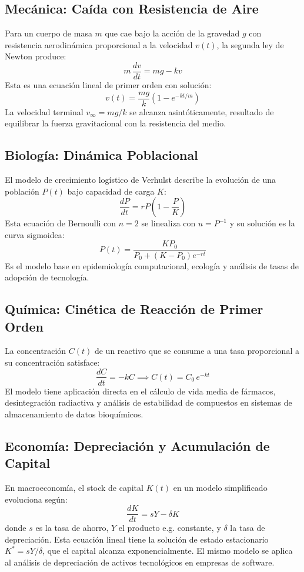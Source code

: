 \documentclass[12pt,letterpaper]{report}
\numberwithin{equation}{chapter}
\numberwithin{figure}{chapter}
\numberwithin{table}{chapter}
\begin{document}
\subsection{Mecánica: Caída con Resistencia de Aire}

Para un cuerpo de masa $m$ que cae bajo la acción de la gravedad $g$ con resistencia aerodinámica proporcional a la velocidad $v(t)$, la segunda ley de Newton produce:
\[
m\,\dfrac{dv}{dt} = mg - kv
\]
Esta es una ecuación lineal de primer orden con solución:
\[
v(t) = \dfrac{mg}{k}\!\left(1 - e^{-kt/m}\right)
\]
La velocidad terminal $v_{\infty} = mg/k$ se alcanza asintóticamente, resultado de equilibrar la fuerza gravitacional con la resistencia del medio.

\subsection{Biología: Dinámica Poblacional}

El modelo de crecimiento logístico de Verhulst describe la evolución de una población $P(t)$ bajo capacidad de carga $K$:
\[
\dfrac{dP}{dt} = rP\!\left(1 - \dfrac{P}{K}\right)
\]
Esta ecuación de Bernoulli con $n = 2$ se linealiza con $u = P^{-1}$ y su solución es la curva sigmoidea:
\[
P(t) = \dfrac{KP_0}{P_0 + (K - P_0)e^{-rt}}
\]
Es el modelo base en epidemiología computacional, ecología y análisis de tasas de adopción de tecnología.

\subsection{Química: Cinética de Reacción de Primer Orden}

La concentración $C(t)$ de un reactivo que se consume a una tasa proporcional a su concentración satisface:
\[
\dfrac{dC}{dt} = -kC \implies C(t) = C_0\,e^{-kt}
\]
El modelo tiene aplicación directa en el cálculo de vida media de fármacos, desintegración radiactiva y análisis de estabilidad de compuestos en sistemas de almacenamiento de datos bioquímicos.

\subsection{Economía: Depreciación y Acumulación de Capital}

En macroeconomía, el stock de capital $K(t)$ en un modelo simplificado evoluciona según:
\[
\dfrac{dK}{dt} = sY - \delta K
\]
donde $s$ es la tasa de ahorro, $Y$ el producto e.g. constante, y $\delta$ la tasa de depreciación. Esta ecuación lineal tiene la solución de estado estacionario $K^* = sY/\delta$, que el capital alcanza exponencialmente. El mismo modelo se aplica al análisis de depreciación de activos tecnológicos en empresas de software.
\end{document}
